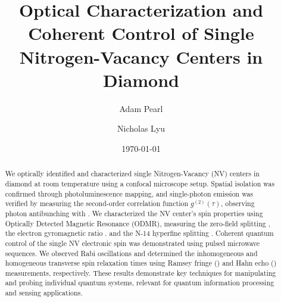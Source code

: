 \documentclass[aps,prb,twocolumn,superscriptaddress,floatfix,longbibliography,citeautoscript]{revtex4-2}
\newcommand{\mytitle}{Optical Characterization and Coherent Control of Single Nitrogen-Vacancy Centers in Diamond}
\begin{document}



\title{\mytitle}

\author{Adam Pearl}
\author{Nicholas Lyu}

\date{\today}


\begin{abstract}

We optically identified and characterized single Nitrogen-Vacancy (NV) 
centers in diamond at room temperature using a confocal microscope setup. Spatial isolation was confirmed through photoluminescence mapping, and single-photon emission was verified by measuring the second-order correlation function $g^{(2)}(\tau)$, observing photon antibunching with . We characterized the NV center's spin properties using Optically Detected Magnetic Resonance (ODMR), measuring the zero-field splitting , 
the electron gyromagnetic ratio . 
and the N-14 hyperfine splitting . 
Coherent quantum control of the single NV electronic spin was demonstrated using pulsed microwave sequences. 
We observed Rabi oscillations and determined the inhomogeneous and homogeneous transverse spin relaxation times using Ramsey fringe 
() and Hahn echo () measurements, respectively. 
These results demonstrate key techniques for manipulating and probing individual quantum systems, 
relevant for quantum information processing and sensing applications.

\end{abstract}
\end{document}
